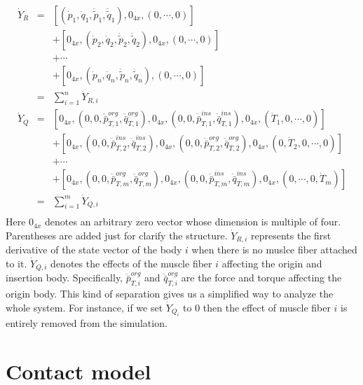 \documentclass[a4paper,10pt]{article}
\begin{document}
\begin{eqnarray*}\label{dotY2}
\dot{Y}_R & = & [ (\dot{p}_1, \dot{q}_1, \ddot{\tilde{p}}_1, \ddot{\tilde{q}}_1),
                  0_{4x}, (0, \cdots , 0)]\\
          &   & + [ 0_{4x}, (\dot{p}_2, \dot{q}_2, \ddot{\tilde{p}}_2, \ddot{\tilde{q}}_2),
                  0_{4x}, (0, \cdots , 0)]\\
          &   & + \cdots\\
          &   & + [ 0_{4x}, (\dot{p}_n, \dot{q}_n, \ddot{\tilde{p}}_n, \ddot{\tilde{q}}_n),
                  (0, \cdots , 0)]\\
          & = & \sum_{i=1}^{n}{\dot{Y}_{R,i}}\\
\dot{Y}_Q & = & [ 0_{4x}, (0, 0, \ddot{\bar{p}}_{T,1}^{org}, \ddot{\bar{q}}_{T,1}^{org}),
                  0_{4x}, (0, 0, \ddot{\bar{p}}_{T,1}^{ins}, \ddot{\bar{q}}_{T,1}^{ins}),
                  0_{4x}, (\dot{T}_1, 0, \cdots, 0)]\\
          &   & + [ 0_{4x}, (0, 0, \ddot{\bar{p}}_{T,2}^{ins}, \ddot{\bar{q}}_{T,2}^{ins}),
                    0_{4x}, (0, 0, \ddot{\bar{p}}_{T,2}^{org}, \ddot{\bar{q}}_{T,2}^{org}),
                    0_{4x}, (0, \dot{T}_2, 0, \cdots, 0)]\\
          &   & + \cdots\\
          &   & + [ 0_{4x}, (0, 0, \ddot{\bar{p}}_{T,m}^{org}, \ddot{\bar{q}}_{T,m}^{org}),
                    0_{4x}, (0, 0, \ddot{\bar{p}}_{T,m}^{ins}, \ddot{\bar{q}}_{T,m}^{ins}),
                    0_{4x}, (0, \cdots, 0, \dot{T}_m)]\\
          & = & \sum_{i=1}^{m}{\dot{Y}_{Q,i}}\\
\end{eqnarray*}
Here $0_{4x}$ denotes an arbitrary zero vector whose dimension is multiple of four.
Parentheses are added just for clarify the structure.
$\dot{Y}_{R,i}$ represents the first derivative of the state vector of the body $i$
when there is no muslce fiber attached to it. $\dot{Y}_{Q,i}$ denotes the effects of
the muscle fiber $i$ affecting the origin and insertion body. Specifically,
$ \ddot{\bar{p}}_{T,i}^{org} $ and $ \ddot{\bar{q}}_{T,i}^{org} $ are the force and
torque affecting the origin body. This kind of separation gives us a simplified
way to analyze the whole system. For instance, if we set $\dot{Y}_{Q_i}$ to 0 then
the effect of muscle fiber $i$ is entirely removed from the simulation.

\section{Contact model}
\end{document}
